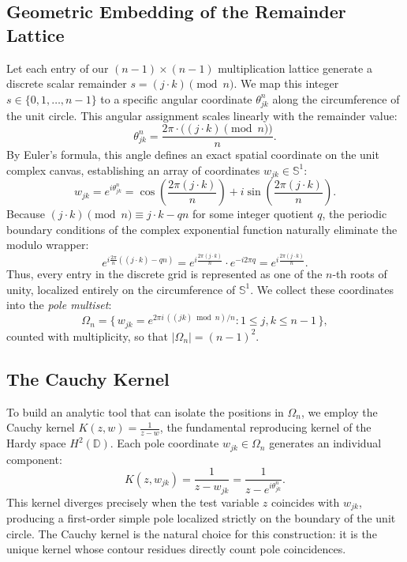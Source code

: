 \documentclass[11pt,twoside]{article}
\begin{document}
	\subsection{Geometric Embedding of the Remainder Lattice}
	Let each entry of our $(n-1) \times (n-1)$ multiplication lattice generate a discrete scalar remainder $s = (j \cdot k) \pmod n$. We map this integer $s \in \{0, 1, \dots, n-1\}$ to a specific angular coordinate $\theta^{n}_{jk}$ along the circumference of the unit circle. This angular assignment scales linearly with the remainder value:
	\begin{equation}
		\theta^{n}_{jk} = \frac{2\pi \cdot \big((j \cdot k) \pmod n\big)}{n}.
	\end{equation}
	By Euler's formula, this angle defines an exact spatial coordinate on the unit complex canvas, establishing an array of coordinates $w_{jk} \in \mathbb{S}^1$:
	\begin{equation}
		w_{jk} = e^{i \theta^{n}_{jk}} = \cos\left(\frac{2\pi (j \cdot k)}{n}\right) + i \sin\left(\frac{2\pi (j \cdot k)}{n}\right).
	\end{equation}
	Because $(j \cdot k) \pmod n \equiv j \cdot k - qn$ for some integer quotient $q$, the periodic boundary conditions of the complex exponential function naturally eliminate the modulo wrapper:
	\begin{equation}
		e^{i \frac{2\pi}{n} ((j \cdot k) - qn)} = e^{i \frac{2\pi (j \cdot k)}{n}} \cdot e^{-i 2\pi q} = e^{i \frac{2\pi (j \cdot k)}{n}}.
	\end{equation}
	Thus, every entry in the discrete grid is represented as one of the $n$-th roots of unity, localized entirely on the circumference of $\mathbb{S}^1$. We collect these coordinates into the \emph{pole multiset}:
	\begin{equation}
		\Omega_n = \bigl\{\, w_{jk} = e^{2\pi i \, ((jk) \bmod n)/n} : 1 \le j, k \le n-1 \,\bigr\},
	\end{equation}
	counted with multiplicity, so that $|\Omega_n| = (n-1)^2$.
	
	\subsection{The Cauchy Kernel}
	To build an analytic tool that can isolate the positions in $\Omega_n$, we employ the Cauchy kernel $K(z, w) = \frac{1}{z - w}$, the fundamental reproducing kernel of the Hardy space $H^2(\mathbb{D})$. Each pole coordinate $w_{jk} \in \Omega_n$ generates an individual component:
	\begin{equation}
		K(z, w_{jk}) = \frac{1}{z - w_{jk}} = \frac{1}{z - e^{i\theta^{n}_{jk}}}.
	\end{equation}
	This kernel diverges precisely when the test variable $z$ coincides with $w_{jk}$, producing a first-order simple pole localized strictly on the boundary of the unit circle. The Cauchy kernel is the natural choice for this construction: it is the unique kernel whose contour residues directly count pole coincidences.
	
\end{document}
